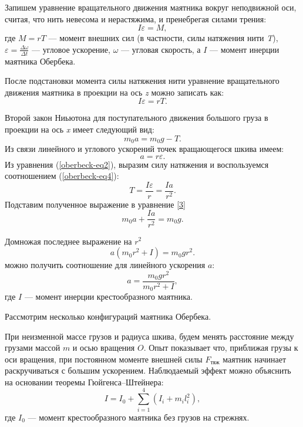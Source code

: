 \documentclass[14pt,a4paper,oneside]{extarticle}	%
\begin{document}
	Запишем уравнение вращательного движения маятника вокруг неподвижной оси, считая, что нить невесома и нерастяжима, и пренебрегая силами трения:
	\begin{equation}\label{oberbeck-eq1}
	I\varepsilon = M,
	\end{equation}
	где $ M=rT $ — момент внешних сил (в частности, силы натяжения нити \textit{T}), $ \varepsilon = \frac{\Delta\omega}{\Delta t} $ — угловое ускорение, $ \omega $ — угловая скорость, а $ I $ — момент инерции маятника Обербека.
	
	После подстановки момента силы натяжения нити уравнение вращательного движения маятника в проекции на ось \textit{z} можно записать как:
	\begin{equation}\label{oberbeck-eq2}
	I\varepsilon = rT. 
	\end{equation}
	
	Второй закон Ниьютона для поступательного движения большого груза в проекции на ось \textit{x} имеет следующий вид:
	\begin{equation}\label{oberbeck-eq3}
	m_0a = m_0g - T.
	\end{equation}
	Из связи линейного и углового ускорений точек вращающегося шкива имеем:
	\begin{equation}\label{oberbeck-eq4}
	a = r\varepsilon.
	\end{equation}
	Из уравнения (\ref{oberbeck-eq2}), выразим силу натяжения и воспользуемся соотношением (\ref{oberbeck-eq4}):
	\begin{equation}\label{oberbeck-eq5}
	T = \frac{I\varepsilon}{r} = \frac{Ia}{r^{2}}.
	\end{equation}
	Подставим полученное выражение в уравнение \ref{3}
	\begin{equation}\label{oberbeck-eq6}
	m_0a + \frac{Ia}{r^{2}} = m_0g.
	\end{equation}
	
	Домножая последнее выражение на $ r^{2} $
	\begin{equation}\label{oberbeck-eq7}
	a(m_0r^{2} + I) = m_0gr^{2}.
	\end{equation}
	можно получить соотношение для линейного ускорения $ a $:
		\begin{equation}\label{oberbeck-eq8}
	a = \frac{m_0gr^{2}}{m_0r^{2} + I},
	\end{equation}
	где $ I $ — момент инерции крестообразного маятника.
	
   Рассмотрим несколько конфигураций маятника Обербека.
            
  При неизменной массе грузов и радиуса шкива, будем менять расстояние между грузами массой $ m $ и осью вращения $ O $.
    Опыт показывает что, приближая грузы к оси вращения, при постоянном моменте внешней силы $ F_{\text{тяж}} $ маятник начинает раскручиваться с большим ускорением.
    Наблюдаемый эффект можно объяснить на основании теоремы Гюйгенса–Штейнера: 
    \begin{equation}\label{oberbeck-eq9}
    I = I_{0} + \sum_{i = 1}^{4}(I_{i}+m_{i}l_{i}^{2}),
    \end{equation}
    где $ I_{0} $ —  момент крестообразного маятника без грузов на стрежнях.
    
\end{document}

